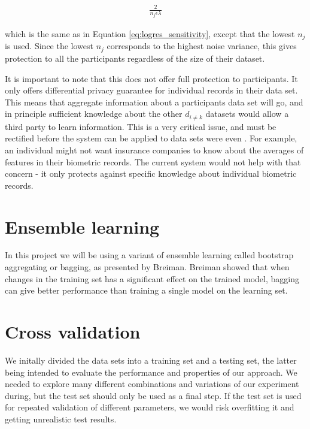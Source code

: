 \begin{eqnarray}
\label{eq:aggregated_logistic_sensitivity}
\frac{2}{n_j\epsilon\lambda}
\end{eqnarray}


which is the same as in Equation \ref{eq:logres_sensitivity}, except that the lowest $n_j$ is used. Since the lowest $n_j$ corresponds to the highest noise variance, this gives protection to all the participants regardless of the size of their dataset.

It is important to note that this does not offer full protection to participants. It only offers differential privacy guarantee for individual records in their data set. This means that aggregate information about a participants data set will go, and in principle sufficient knowledge about the other $d_{i \neq k}$ datasets would allow a third party to learn information. This is a very critical issue, and must be rectified before the system can be applied to data sets were even . For example, an individual might not want insurance companies to know about the averages of features in their biometric records. The current system would not help with that concern - it only protects against specific knowledge about 
individual biometric records.

\section{Ensemble learning}

In this project we will be using a variant of ensemble learning called bootstrap aggregating or bagging, as presented by Breiman\cite{breiman1996bagging}. Breiman showed that when changes in the training set has a significant effect on the trained model, bagging can give better performance than training a single model on the learning set.

\section{Cross validation}

We initally divided the data sets into a training set and a testing set, the latter being intended to evaluate the performance and properties of our approach. We needed to explore many different combinations and variations of our experiment during, but the test set should only be used as a final step. If the test set is used for repeated validation of different parameters, we would risk overfitting it and getting unrealistic test results. 

